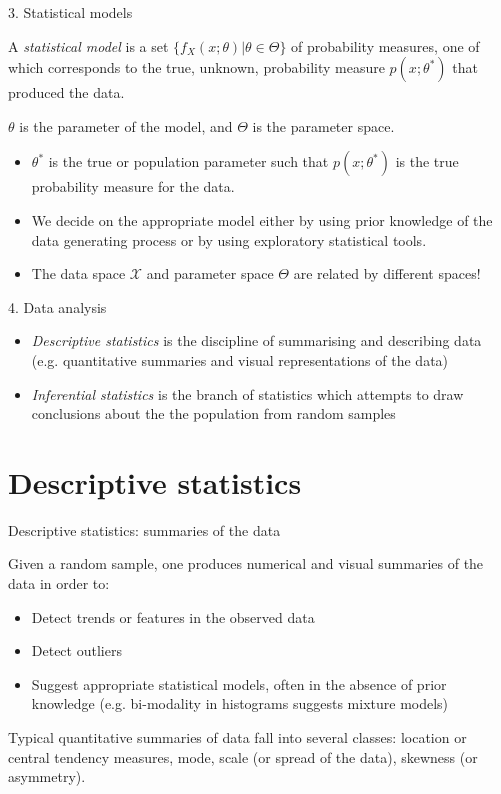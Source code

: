 \documentclass{beamer}
\begin{document}
\begin{frame}{3. Statistical models}

	\begin{block}{}
		A \textit{statistical model} is a set $\{f_X(x;\theta)| \theta \in \Theta\}$ of probability measures,
	one of which corresponds to the true, unknown, probability measure $p(x; \theta^*)$ that produced the data.
	\end{block}
	$\theta$ is the parameter of the model, and $\Theta$ is the parameter space.

	\pause
	\small

	\begin{itemize}
		\item $\theta^*$ is the true or population parameter such that $p(x; \theta^*)$ is the true probability measure for the data.
		\item We decide on the appropriate model either by using prior knowledge of the data generating process or by using exploratory  statistical tools.
		\item The data space $\mathcal{X}$ and parameter space $\Theta$ are related by different spaces!
	\end{itemize}

\end{frame}

\begin{frame}{4. Data analysis}

	\begin{itemize}
		\item \textit{Descriptive statistics} is the discipline of summarising and describing data (e.g. quantitative summaries and 
	visual representations of the data)
		\item \textit{Inferential statistics} is the branch of statistics which attempts to draw conclusions about the the population from random samples
	\end{itemize}

\end{frame}

\section{Descriptive statistics}

\begin{frame}{Descriptive statistics: summaries of the data}

	Given a random sample, one produces numerical and visual summaries of the data in order to:
	\begin{itemize}
		\item Detect trends or features in the observed data
		\item Detect outliers
		\item Suggest appropriate statistical models, often in the absence of prior knowledge (e.g. bi-modality in histograms suggests mixture models)
	\end{itemize}	

	Typical quantitative summaries of data fall into several classes: location or central tendency measures,
	mode, scale (or spread of the data), skewness (or asymmetry).

\end{frame}
\end{document}
